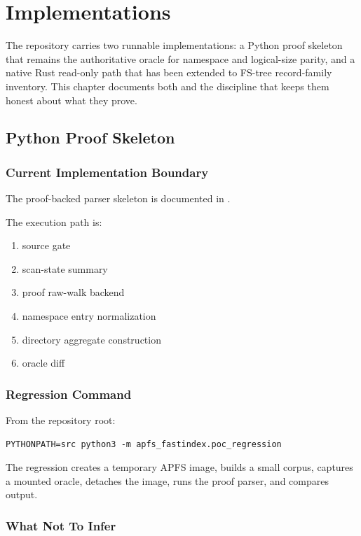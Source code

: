\chapter{Implementations}

The repository carries two runnable implementations: a Python proof skeleton
that remains the authoritative oracle for namespace and logical-size parity,
and a native Rust read-only path that has been extended to FS-tree record-family
inventory. This chapter documents both and the discipline that keeps them
honest about what they prove.

\section{Python Proof Skeleton}

\subsection{Current Implementation Boundary}

The proof-backed parser skeleton is documented in
.

The execution path is:

\begin{enumerate}
  \item source gate
  \item scan-state summary
  \item proof raw-walk backend
  \item namespace entry normalization
  \item directory aggregate construction
  \item oracle diff
\end{enumerate}

\subsection{Regression Command}

From the repository root:

\begin{verbatim}
PYTHONPATH=src python3 -m apfs_fastindex.poc_regression
\end{verbatim}

The regression creates a temporary APFS image, builds a small corpus, captures a
mounted oracle, detaches the image, runs the proof parser, and compares output.

\subsection{What Not To Infer}

